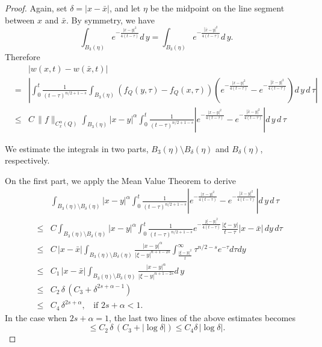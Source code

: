\documentclass[12pt]{article}
\theoremstyle{remark}
\numberwithin{equation}{section}
\begin{document}
\begin{proof} Again, set $\delta = |x-\bar{x}|$, and let $\eta$ be the midpoint on the line segment between $x$ and $\bar{x}$.
By symmetry, we have
\begin{equation} \label{3.10a}
\int_{B_3 (\eta)} e^{- \frac{|x-y|^2}{4(t-\tau)}} d \, y = \int_{B_3 (\eta)} e^{- \frac{|\bar{x}-y|^2}{4(t-\tau)}} d \, y.
\end{equation}
Therefore
\begin{eqnarray}
& & |w(x,t) - w(\bar{x}, t)| \nonumber \\
& = & \left| \int_0^t \frac{1}{(t-\tau)^{n/2+1-s}} \int_{B_3(\eta)} ( f_Q (y,\tau) - f_Q(x,\tau) ) \left(  e^{- \frac{|x-y|^2}{4(t-\tau)}} -
e^{- \frac{|\bar{x}-y|^2}{4(t-\tau)}} \right) d \, y \, d \, \tau \right| \nonumber \\
& \leq & C \, \|f\|_{C_x^\alpha(Q)}   \int_{B_3(\eta)} |x-y|^\alpha \int_0^t \frac{1}{(t-\tau)^{n/2+1-s}} \left|  e^{- \frac{|x-y|^2}{4(t-\tau)}} -
e^{- \frac{|\bar{x}-y|^2}{4(t-\tau)}} \right| d \, y \, d \, \tau
\label{3.14}
\end{eqnarray}

 We estimate the integrals in two parts, $B_3(\eta) \setminus B_\delta (\eta)$ and $B_\delta (\eta)$,  respectively.

On the first part, we apply the Mean Value Theorem to derive
\begin{eqnarray}
& &  \int_{B_3(\eta)\setminus B_\delta (\eta)} |x-y|^\alpha \int_0^t \frac{1}{(t-\tau)^{n/2+1-s}} \left|  e^{- \frac{|x-y|^2}{4(t-\tau)}} -
e^{- \frac{|\bar{x}-y|^2}{4(t-\tau)}} \right| d \, y \, d \, \tau \nonumber \\
& \leq & C  \int_{B_3(\eta) \setminus B_\delta (\eta)} |x-y|^\alpha \int_0^t \frac{1}{(t-\tau)^{n/2+1-s}} e^{-\frac{|\xi-y|^2}{4(t-\tau)}} \frac{|\xi-y|}{t-\tau} |x - \bar{x}| \, d y \, d \tau \nonumber \\
& \leq & C \, |x-\bar{x}| \int_{B_3(\eta) \setminus B_\delta (\eta)} \frac{|x-y|^\alpha}{|\xi -y|^{n+1-2s}} \int_{\frac{|\xi -y|^2}{t}}^\infty \tau^{n/2-s} e^{-\tau} d \tau d y \nonumber \\
& \leq & C_1 \, |x-\bar{x}| \int_{B_3(\eta) \setminus B_\delta (\eta)} \frac{|x-y|^\alpha}{|\xi -y|^{n+1-2s}} d \, y \nonumber \\
& \leq & C_2 \, \delta \, ( C_3 + \delta^{2s+\alpha-1}) \nonumber \\
& \leq & C_4 \, \delta^{2s+\alpha}, \; \; \mbox{ if } 2s +\alpha <1.
\label{3.11}
\end{eqnarray}
In the case when $2s +\alpha =1$, the last two lines of the above estimates becomes
$$ \leq C_2 \, \delta \, ( C_3 + |\log \delta| ) \leq C_4 \delta \, |\log \delta|.$$


\end{proof}
\end{document}

